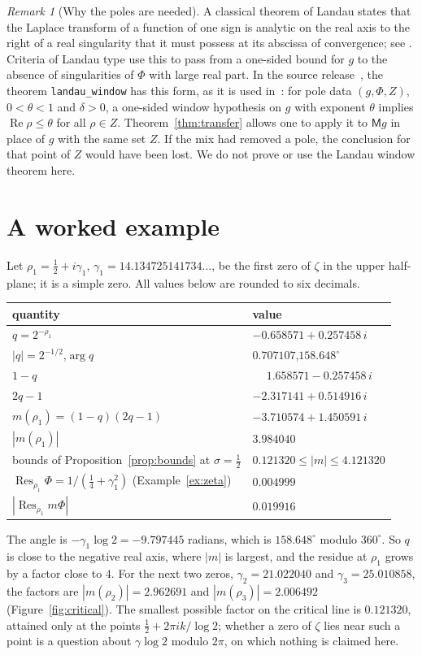 \documentclass[11pt]{amsart}
\theoremstyle{definition}
\theoremstyle{remark}
\newtheorem{remark}[theorem]{Remark}
\DeclareMathOperator{\re}{Re}
\DeclareMathOperator*{\res}{Res}
\newcommand{\M}{\mathsf{M}}
\newcommand{\lean}[1]{\texttt{#1}}
\begin{document}
\begin{remark}[Why the poles are needed]\label{rem:landau}
A classical theorem of Landau states that the Laplace transform of a function of one sign is
analytic on the real axis to the right of a real singularity that it must possess at its abscissa
of convergence; see \cite[\S15.1]{MV}. Criteria of Landau type use this to pass from a one-sided
bound for $g$ to the absence of singularities of $\Phi$ with large real part. In the source
release~\cite{upstream}, the theorem \lean{landau\_window} has this form, as it is used
in~\cite{Crossley-transfer}: for pole data $(g,\Phi,Z)$, $0<\theta<1$ and $\delta>0$, a one-sided
window hypothesis on $g$ with exponent $\theta$ implies $\re\rho\le\theta$ for all $\rho\in Z$.
Theorem~\ref{thm:transfer} allows one to apply it to $\M g$ in place of $g$ with the same set $Z$.
If the mix had removed a pole, the conclusion for that point of $Z$ would have been lost. We do not
prove or use the Landau window theorem here.
\end{remark}

\section{A worked example}\label{sec:example}

Let $\rho_1=\tfrac12+i\gamma_1$, $\gamma_1=14.134725141734\ldots$, be the first zero of $\zeta$ in
the upper half-plane; it is a simple zero. All values below are rounded to six decimals.
\begin{center}
\begin{tabular}{@{}ll@{}}
\toprule
quantity & value\\
\midrule
$q=2^{-\rho_1}$ & $-0.658571+0.257458\,i$\\
$|q|=2^{-1/2}$,\quad $\arg q$ & $0.707107$,\quad $158.648^\circ$\\
$1-q$ & $\phantom{-}1.658571-0.257458\,i$\\
$2q-1$ & $-2.317141+0.514916\,i$\\
$m(\rho_1)=(1-q)(2q-1)$ & $-3.710574+1.450591\,i$\\
$|m(\rho_1)|$ & $3.984040$\\
bounds of Proposition~\ref{prop:bounds} at $\sigma=\tfrac12$ & $0.121320\le|m|\le4.121320$\\
$\res_{\rho_1}\Phi=1/(\tfrac14+\gamma_1^2)$ (Example~\ref{ex:zeta}) & $0.004999$\\
$|\res_{\rho_1}m\Phi|$ & $0.019916$\\
\bottomrule
\end{tabular}
\end{center}
The angle is $-\gamma_1\log2=-9.797445$ radians, which is $158.648^\circ$ modulo $360^\circ$. So
$q$ is close to the negative real axis, where $|m|$ is largest, and the residue at $\rho_1$ grows by
a factor close to $4$. For the next two zeros, $\gamma_2=21.022040$ and $\gamma_3=25.010858$, the
factors are $|m(\rho_2)|=2.962691$ and $|m(\rho_3)|=2.006492$ (Figure~\ref{fig:critical}).
The smallest possible factor on the critical line is $0.121320$, attained only at the points
$\tfrac12+2\pi ik/\log2$; whether a zero of $\zeta$ lies near such a point is a question about
$\gamma\log 2$ modulo $2\pi$, on which nothing is claimed here.
\end{document}
